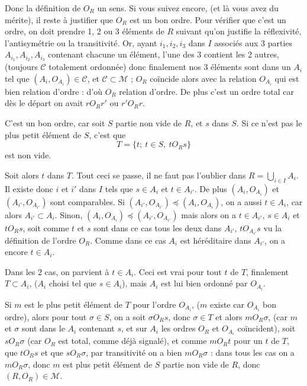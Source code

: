 Donc la définition de $O_R$  un sens. Si vous suivez encore, (et là vous avez du mérite), il reste à justifier que $O_R$ est un bon ordre. Pour vérifier que c'est un ordre, on doit prendre 1, 2 ou 3 éléments de $R$ suivant qu'on justifie la réflexivité, l'antisymétrie ou la transitivité. Or, ayant $i_1,i_2,i_3$ dans $I$ associés aux 3 parties $A_{i_1},A_{i_2},A_{i_3}$ contenant chacune un élément, l'une des 3 contient les 2 autres, (toujours $\mathcal C$ totalement ordonnée) donc finalement nos 3 éléments sont dans un $A_i$ tel que $(A_i,O_{A_i})\in\mathcal C$, et $\mathcal C\subset\mathcal M$ ; $O_R$ coïncide alors avec la relation $O_{A_i}$ qui est bien relation d'ordre : d'où $O_R$ relation d'ordre. De plus c'est un ordre total car dès le départ on avait $rO_Rr'$ ou $r'O_Rr$.

C'est un bon ordre, car soit $S$ partie non vide de $R$, et $s$ dans $S$. Si ce n'est pas le plus petit élément de $S$, c'est que
\[
T=\{t;\ t\in S,\ tO_Rs\}
\]
est non vide.

Soit alors $t$ dans $T$. Tout ceci se passe, il ne faut pas l'oublier dans $R=\bigcup_{i\in I}A_i$. Il existe donc $i$ et $i'$ dans $I$ tels que $s\in A_i$ et $t\in A_{i'}$. De plus $(A_i,O_{A_i})$ et $(A_{i'},O_{A_{i'}})$ sont comparables. Si $(A_{i'},O_{A_{i'}})\preccurlyeq(A_i,O_{A_i})$, on a aussi $t\in A_i$, car alors $A_{i'}\subset A_i$. Sinon, $(A_i,O_{A_i})\preccurlyeq(A_{i'},O_{A_{i'}})$ mais alors on a $t\in A_{i'}$, $s\in A_i$ et $tO_Rs$, soit comme $t$ et $s$ sont dans ce cas tous les deux dans $A_{i'}$, $tO_{A_{i'}}s$ vu la définition de l'ordre $O_R$. Comme dans ce cas $A_i$ est héréditaire dans $A_{i'}$, on a encore $t\in A_i$.

Dans les 2 cas, on parvient à $t\in A_i$. Ceci est vrai pour tout $t$ de $T$, finalement $T\subset A_i$, ($A_i$ choisi tel que $s\in A_i$), mais $A_i$ est lui bien ordonné par $O_{A_i}$.

Si $m$ est le plus petit élément de $T$ pour l'ordre $O_{A_i}$, ($m$ existe car $O_{A_i}$ bon ordre), alors pour tout $\sigma\in S$, on a soit $\sigma O_Rs$, donc $\sigma\in T$ et alors $mO_R\sigma$, (car $m$ et $\sigma$ sont dans le $A_i$ contenant $s$, et sur $A_i$ les ordres $O_R$ et $O_{A_i}$ coïncident), soit $sO_R\sigma$ (car $O_R$ est total, comme déjà signalé), et comme $mO_Rt$ pour un $t$ de $T$, que $tO_Rs$ et que $sO_R\sigma$, par transitivité on a bien $mO_R\sigma$ : dans tous les cas on a $mO_R\sigma$, donc $m$ est plus petit élément de $S$ partie non vide de $R$, donc $(R,O_R)\in\mathcal M$.

